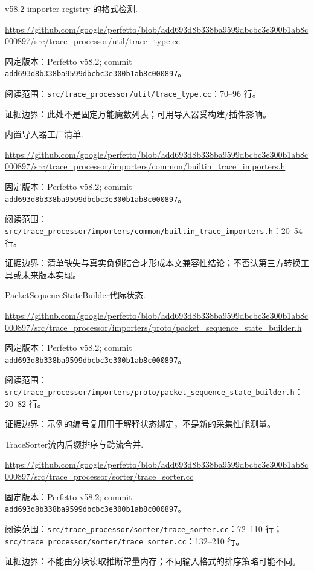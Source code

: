 \documentclass[UTF8,fontset=fandol,openany,11pt]{ctexbook}
\begin{document}
\begin{thebibliography}{999}
 v58.2 importer registry 的格式检测.\par
\url{https://github.com/google/perfetto/blob/add693d8b338ba9599dbcbc3e300b1ab8c000897/src/trace_processor/util/trace_type.cc}\par
{\small\raggedright 固定版本：Perfetto v58.2; commit \texttt{add693d8\allowbreak{}b338ba95\allowbreak{}99dbcbc3\allowbreak{}e300b1ab\allowbreak{}8c000897}。\par
阅读范围：\nolinkurl{src/trace_processor/util/trace_type.cc}：70–96 行。\par
证据边界：此处不是固定万能魔数列表；可用导入器受构建/插件影响。
}

 内置导入器工厂清单.\par
\url{https://github.com/google/perfetto/blob/add693d8b338ba9599dbcbc3e300b1ab8c000897/src/trace_processor/importers/common/builtin_trace_importers.h}\par
{\small\raggedright 固定版本：Perfetto v58.2; commit \texttt{add693d8\allowbreak{}b338ba95\allowbreak{}99dbcbc3\allowbreak{}e300b1ab\allowbreak{}8c000897}。\par
阅读范围：\nolinkurl{src/trace_processor/importers/common/builtin_trace_importers.h}：20–54 行。\par
证据边界：清单缺失与真实负例结合才形成本文兼容性结论；不否认第三方转换工具或未来版本实现。
}

 PacketSequenceStateBuilder代际状态.\par
\url{https://github.com/google/perfetto/blob/add693d8b338ba9599dbcbc3e300b1ab8c000897/src/trace_processor/importers/proto/packet_sequence_state_builder.h}\par
{\small\raggedright 固定版本：Perfetto v58.2; commit \texttt{add693d8\allowbreak{}b338ba95\allowbreak{}99dbcbc3\allowbreak{}e300b1ab\allowbreak{}8c000897}。\par
阅读范围：\nolinkurl{src/trace_processor/importers/proto/packet_sequence_state_builder.h}：20–82 行。\par
证据边界：示例的编号复用用于解释状态绑定，不是新的采集性能测量。
}

 TraceSorter流内后缀排序与跨流合并.\par
\url{https://github.com/google/perfetto/blob/add693d8b338ba9599dbcbc3e300b1ab8c000897/src/trace_processor/sorter/trace_sorter.cc}\par
{\small\raggedright 固定版本：Perfetto v58.2; commit \texttt{add693d8\allowbreak{}b338ba95\allowbreak{}99dbcbc3\allowbreak{}e300b1ab\allowbreak{}8c000897}。\par
阅读范围：\nolinkurl{src/trace_processor/sorter/trace_sorter.cc}：72–110 行；\nolinkurl{src/trace_processor/sorter/trace_sorter.cc}：132–210 行。\par
证据边界：不能由分块读取推断常量内存；不同输入格式的排序策略可能不同。
}


\end{thebibliography}
\end{document}
